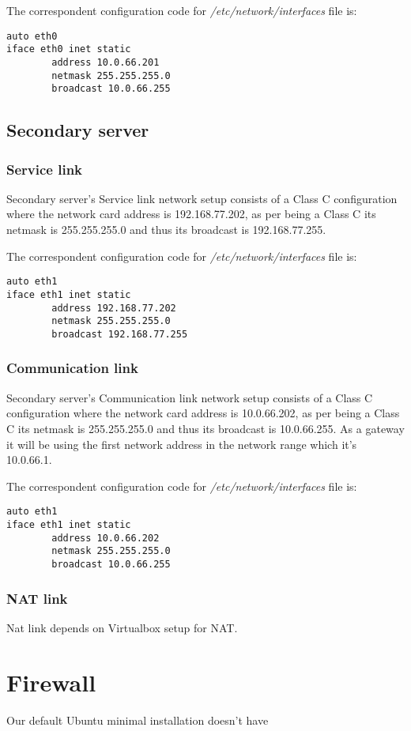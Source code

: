 The correspondent configuration code for \textit{/etc/network/interfaces} file is:
\begin{verbatim}
auto eth0
iface eth0 inet static
        address 10.0.66.201
        netmask 255.255.255.0
        broadcast 10.0.66.255
\end{verbatim}
\subsection {Secondary server}
\subsubsection {Service link}
Secondary server's Service link network setup consists of a Class C configuration where the network card address is 192.168.77.202, as per being a Class C its netmask is 255.255.255.0 and thus its broadcast is 192.168.77.255.

The correspondent configuration code for \textit{/etc/network/interfaces} file is:
\begin{verbatim}
auto eth1
iface eth1 inet static
        address 192.168.77.202
        netmask 255.255.255.0
        broadcast 192.168.77.255
\end{verbatim}

\subsubsection {Communication link}
Secondary server's Communication link network setup consists of a Class C configuration where the network card address is 10.0.66.202, as per being a Class C its netmask is 255.255.255.0 and thus its broadcast is 10.0.66.255. As a gateway it will be using the first network address in the network range which it's 10.0.66.1.

The correspondent configuration code for \textit{/etc/network/interfaces} file is:
\begin{verbatim}
auto eth1
iface eth1 inet static
        address 10.0.66.202
        netmask 255.255.255.0
        broadcast 10.0.66.255
\end{verbatim}

\subsubsection {NAT link}
Nat link depends on Virtualbox setup for NAT.

\section {Firewall}
Our default Ubuntu minimal installation doesn't have 

